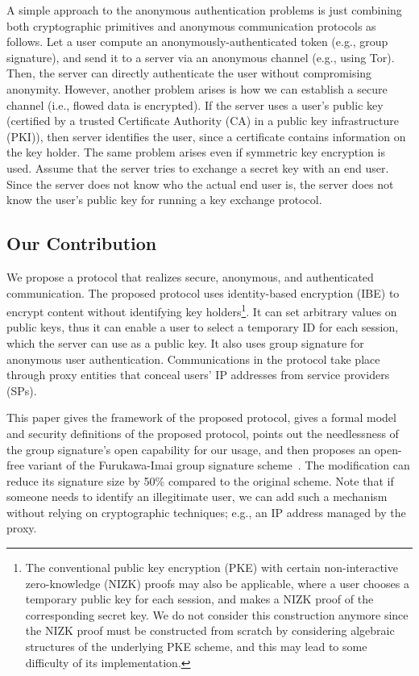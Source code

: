 \documentclass[preprint]{sig-alternate}
\begin{document}
A simple approach to the anonymous authentication problems is just combining both cryptographic primitives and anonymous communication protocols as follows. 
Let a user compute an anonymously-authenticated token (e.g., group signature), 
and send it to a server via an anonymous channel (e.g., using Tor). 
Then, the server can directly authenticate the user without compromising anonymity. 
However, another problem arises is how we can establish a secure channel (i.e., flowed data is encrypted). 
If the server uses a user's public key (certified by a trusted Certificate Authority (CA) in a public key infrastructure (PKI)), 
then server identifies the user, since a certificate contains information on the key holder. 
The same problem arises even if symmetric key encryption is used. 
Assume that the server tries to exchange a secret key with an end user.
Since the server does not know who the actual end user is, the server does not know the user's public key for running a key exchange protocol. 

\subsection{Our Contribution}

We propose a protocol that realizes secure, anonymous, and authenticated communication.
The proposed protocol uses identity-based encryption (IBE) to encrypt content without identifying key holders\footnote{The conventional public key encryption (PKE) with certain non-interactive zero-knowledge (NIZK) proofs may also be applicable, where a user chooses a temporary public key for each session, and makes a NIZK proof of the corresponding secret key. We do not consider this construction anymore since the NIZK proof must be constructed from scratch by considering algebraic structures of the underlying PKE scheme, and this may lead to some difficulty of its implementation. }.
It can set arbitrary values on public keys, thus it can enable a user to select a temporary ID for each session, which the server can use as a public key.
It also uses group signature for anonymous user authentication. 
Communications in the protocol take place through proxy entities that conceal users' IP addresses from service providers (SPs). 

This paper gives the framework of the proposed protocol, gives a formal model and security definitions of the proposed protocol, points out the needlessness of the group signature's open capability for our usage, 
and then proposes an open-free variant of the Furukawa-Imai group signature scheme~\cite{[FurukawaI06]}. 
The modification can reduce its signature size by 50\% compared to the original scheme.
Note that if someone needs to identify an illegitimate user, we can add such a mechanism without relying on cryptographic techniques; e.g., an IP address managed by the proxy. 
\end{document}
